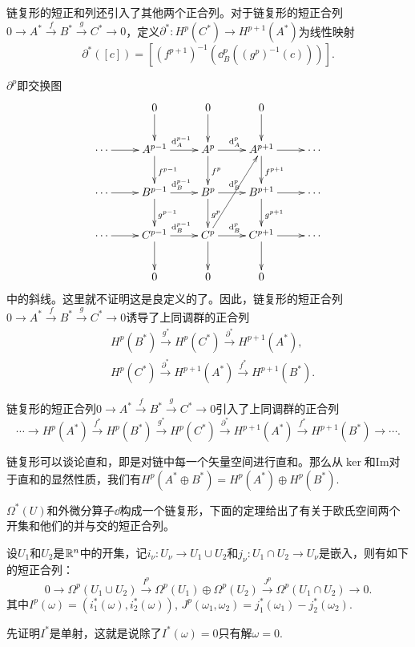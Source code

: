 \para 链复形的短正和列还引入了其他两个正合列。对于链复形的短正合列$
0\to A^*\xrightarrow{f}B^*\xrightarrow{g}C^*\to 0$，定义$\partial^*:H^p(C^*)\to H^{p+1}(A^*)$为线性映射
\[
	\partial^*([c])=\left[(f^{p+1})^{-1}\left(\dd^p_B\left((g^p)^{-1}(c)\right)\right)\right].
\]

$\partial^p$即交换图
	\[
		\xymatrix{
			&0\ar[d]&0\ar[d]&0\ar[d]&\\
			\cdots\ar[r]&A^{p-1}\ar[r]^{\dd_A^{p-1}}\ar[d]^{f^{p-1}}&A^p\ar[r]^{\dd_A^p}\ar[d]^{f^{p}}&A^{p+1}\ar[r]\ar[d]^{f^{p+1}}&\cdots\\
			\cdots\ar[r]&B^{p-1}\ar[r]^{\dd_B^{p-1}}\ar[d]^{g^{p-1}}&B^p\ar[r]^{\dd_B^p}\ar[d]^{g^{p}}&B^{p+1}\ar[r]\ar[d]^{g^{p+1}}&\cdots\\
			\cdots\ar[r]&C^{p-1}\ar[r]^{\dd_B^{p-1}}\ar[d]&C^p\ar[r]^{\dd_B^p}\ar[d]\ar[ruu]&C^{p+1}\ar[r]\ar[d]&\cdots\\
			&0&0&0&
		}
	\]
中的斜线。这里就不证明这是良定义的了。因此，链复形的短正合列$0\to A^*\xrightarrow{f}B^*\xrightarrow{g}C^*\to 0$诱导了上同调群的正合列
\[
\begin{split}
&H^p(B^*)\xrightarrow{g^*}H^p(C^*)\xrightarrow{\partial^*}H^{p+1}(A^*),\\
&H^p(C^*)\xrightarrow{\partial^*}H^{p+1}(A^*)\xrightarrow{f^*}H^{p+1}(B^*).
\end{split}
\]

\theo \label{longexact}
链复形的短正合列$0\to A^*\xrightarrow{f}B^*\xrightarrow{g}C^*\to 0$引入了上同调群的正合列
\[
\cdots\to H^p(A^*)\xrightarrow{f^*}H^p(B^*)\xrightarrow{g^*}H^p(C^*)\xrightarrow{\partial^*}H^{p+1}(A^*)\xrightarrow{f^*}H^{p+1}(B^*)\to\cdots.
\]

\pro \label{directsum} 链复形可以谈论直和，即是对链中每一个矢量空间进行直和。那么从$\ker$和$\mathrm{Im}$对于直和的显然性质，我们有$H^p(A^*\oplus B^*)=H^p(A^*)\oplus H^p(B^*)$.

$\Omega^*(U)$和外微分算子$\dd$构成一个链复形，下面的定理给出了有关于欧氏空间两个开集和他们的并与交的短正合列。

\theo 设$U_1$和$U_2$是$\mathbb{R}^n$中的开集，记$i_\nu:U_\nu \to U_1 \cup U_2$和$j_\nu:U_1\cap U_2 \to U_\nu$是嵌入，则有如下的短正合列：
\[
0\to \Omega^p(U_1\cup U_2)\xrightarrow{I^p}\Omega^p(U_1)\oplus\Omega^p(U_2)\xrightarrow{J^p}\Omega^p(U_1\cap U_2)\to 0.
\]
其中$I^p(\omega)=(i_1^*(\omega),i_2^*(\omega))$, $J^p(\omega_1,\omega_2)=j_1^*(\omega_1)-j_2^*(\omega_2)$.

\proof 先证明$I^*$是单射，这就是说除了$I^*(\omega)=0$只有解$\omega=0$.

